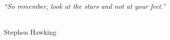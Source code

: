 \thispagestyle{empty}
\vspace*{\fill}

\begin{flushright}
\large {\em ``So remember, look at the stars and not at your feet.''}\\

\ \

\normalsize
{Stephen Hawking}  
\end{flushright}


\vspace*{\fill}
\vspace*{\fill}


\vspace*{\fill}

\vspace*{\fill}

\vspace*{\fill}

